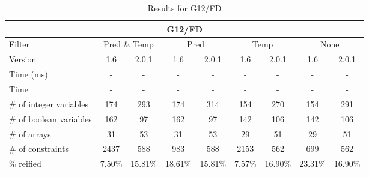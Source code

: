 \documentclass{standalone}
\begin{document}
\begin{table}[H]
\footnotesize
\centering
\begin{tabular}{lc|c|c|c|c|c|c|c}
\multicolumn{9}{c}{G12/FD} \\ 
\hline\hline Filter & \multicolumn{2}{c|}{Pred \& Temp} &\multicolumn{2}{c|}{Pred}  & \multicolumn{2}{c|}{Temp} & \multicolumn{2}{c}{None} \\ 
\hline Version & 1.6 & 2.0.1 & 1.6 & 2.0.1 & 1.6 & 2.0.1 & 1.6 & 2.0.1 \\ 
Time (ms)               & - & - & - & - & - & - & - & - \\
Time                    & - & - & - & - & - & - & - & - \\ 
\# of integer variables & 174 & 293 & 174 & 314 & 154 & 270 & 154 & 291 \\ 
\# of boolean variables & 162 & 97 & 162 & 97 & 142 & 106 & 142 & 106 \\ 
\# of arrays            & 31 & 53 & 31 & 53 & 29 & 51 & 29 & 51 \\ 
\# of constraints       & 2437 & 588 & 983 & 588 & 2153 & 562 & 699 & 562 \\ 
\% reified               & 7.50\% & 15.81\% & 18.61\% & 15.81\% & 7.57\% & 16.90\% &23.31\% & 16.90\% \\ 
\end{tabular}
\caption{Results for G12/FD}\label{tab:res_g12}
\end{table} 
\end{document}
